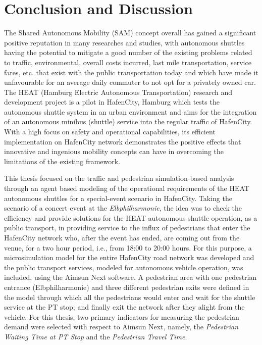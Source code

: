 \chapter{Conclusion and Discussion}\label{chapter:conclusion&discussion}
The Shared Autonomous Mobility (SAM) concept overall has gained a significant positive reputation in many researches and studies, with autonomous shuttles having the potential to mitigate a good number of the existing problems related to traffic, environmental, overall costs incurred, last mile transportation, service fares, etc. that exist with the public transportation today and which have made it unfavourable for an average daily commuter to not opt for a privately owned car. The HEAT (Hamburg Electric Autonomous Transportation) research and development project is a pilot in HafenCity, Hamburg which tests the autonomous shuttle system in an urban environment and aims for the integration of an autonomous minibus (shuttle) service into the regular traffic of HafenCity. With a high focus on safety and operational capabilities, its efficient implementation on HafenCity network demonstrates the positive effects that innovative and ingenious mobility concepts can have in overcoming the limitations of the existing framework.

This thesis focused on the traffic and pedestrian simulation-based analysis through an agent based modeling of the operational requirements of the HEAT autonomous shuttles for a special-event scenario in HafenCity. Taking the scenario of a concert event at the \textit{Elbphilharmonie}, the idea was to check the efficiency and provide solutions for the HEAT autonomous shuttle operation, as a public transport, in providing service to the influx of pedestrians that enter the HafenCity network who, after the event has ended, are coming out from the venue, for a two hour period, i.e., from 18:00 to 20:00 hours. For this purpose, a microsimulation model for the entire HafenCity road network was developed and the public transport services, modeled for autonomous vehicle operation, was included, using the Aimsun Next software. A pedestrian area with one pedestrian entrance (Elbphilharmonie) and three different pedestrian exits were defined in the model through which all the pedestrians would enter and wait for the shuttle service at the PT stop; and finally exit the network after they alight from the vehicle. For this thesis, two primary indicators for measuring the pedestrian demand were selected with respect to Aimsun Next, namely, the \textit{Pedestrian Waiting Time at PT Stop} and the \textit{Pedestrian Travel Time}.

